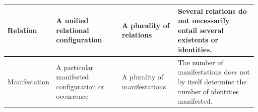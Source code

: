 \begin{table}[htbp]
\begin{tabular}{|p{2.4cm}|p{3.1cm}|p{3.2cm}|p{4.5cm}|}
Relation &
A unified relational configuration &
A plurality of relations &
Several relations do not necessarily entail several existents or identities.
\\
\hline

Manifestation &
A particular manifested configuration or occurrence &
A plurality of manifestations &
The number of manifestations does not by itself determine the number of identities manifested.
\\
\hline

\end{tabular}
\end{table}

